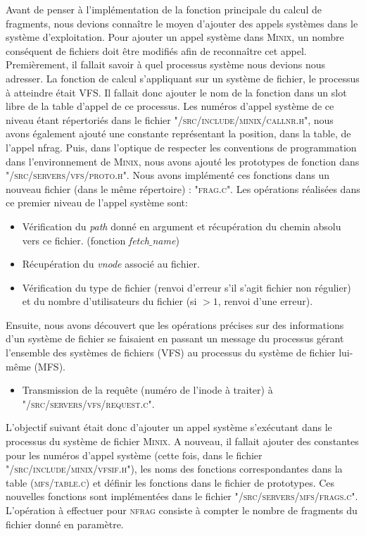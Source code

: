 Avant de penser 	à l'implémentation de la fonction principale du calcul de fragments, nous devions connaître le moyen d'ajouter des appels systèmes dans le système d'exploitation. Pour ajouter un appel système dans \textsc{Minix}, un nombre conséquent de fichiers doit être modifiés afin de reconnaître cet appel. Premièrement, il fallait savoir à quel processus système nous devions nous adresser. La fonction de calcul s'appliquant sur un système de fichier, le processus à atteindre était \textsc{VFS}. Il fallait donc ajouter le nom de la fonction dans un slot libre de la table d'appel de ce processus. Les numéros d'appel système de ce niveau étant répertoriés dans le fichier "\textsc{/src/include/minix/callnr.h}", nous avons également ajouté une constante représentant la position, dans la table, de l'appel nfrag. Puis, dans l'optique de respecter les conventions de programmation dans l'environnement de \textsc{Minix}, nous avons ajouté les prototypes de fonction dans "\textsc{/src/servers/vfs/proto.h}". Nous avons implémenté ces fonctions dans un nouveau fichier (dans le même répertoire) : "\textsc{frag.c}". Les opérations réalisées dans ce premier niveau de l'appel système sont: \begin{itemize}
\item Vérification du \textit{path} donné en argument et récupération du chemin absolu vers ce fichier. (fonction \textit{fetch$\_$name})
\item Récupération du \textit{vnode} associé au fichier.
\item Vérification du type de fichier (renvoi d'erreur s'il s'agit fichier non régulier) et du nombre d'utilisateurs du fichier (si $> 1$, renvoi d'une erreur).
\end{itemize} 
Ensuite, nous avons découvert que les opérations précises sur des informations d'un système de fichier se faisaient en passant un message du processus gérant l'ensemble des systèmes de fichiers (VFS) au processus du système de fichier lui-même (MFS). 
\begin{itemize}
\item Transmission de la requête (numéro de l'inode à traiter) à "\textsc{/src/servers/vfs/request.c}".
\end{itemize} 

L'objectif suivant était donc d'ajouter un appel système s'exécutant dans le processus du système de fichier \textsc{Minix}. A nouveau, il fallait ajouter des constantes pour les numéros d'appel système (cette fois, dans le fichier "\textsc{/src/include/minix/vfsif.h}"), les noms des fonctions correspondantes dans la table (\textsc{mfs/table.c}) et définir les fonctions dans le fichier de prototypes. Ces nouvelles fonctions sont implémentées dans le fichier "\textsc{/src/servers/mfs/frags.c}". L'opération à effectuer pour \textsc{nfrag} consiste à compter le nombre de fragments du fichier donné en paramètre. 
